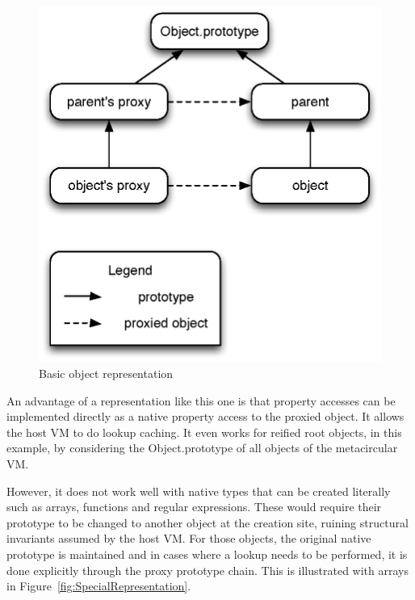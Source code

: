 \begin{figure}[htb]
\begin{center}
\includegraphics[scale=0.75]{figures/objectRepresentation}
\caption{\label{fig:BasicRepresentation} Basic object representation}
\end{center}
\end{figure}

An advantage of a representation like this one is that property accesses can be
implemented directly as a native property access to the proxied object. It
allows the host VM to do lookup caching. It even works for reified root
objects, in this example, by considering  the {Object.prototype} of
all objects of the metacircular VM.

However, it does not work well with native types that can be created literally
such as arrays, functions and regular expressions. These would require their
prototype to be changed to another object at the creation site, ruining
structural invariants assumed by the host VM. For those objects, the original
native prototype is maintained and in cases where a lookup needs to be
performed, it is done explicitly through the proxy prototype chain. This is
illustrated with arrays in Figure~\ref{fig:SpecialRepresentation}.

